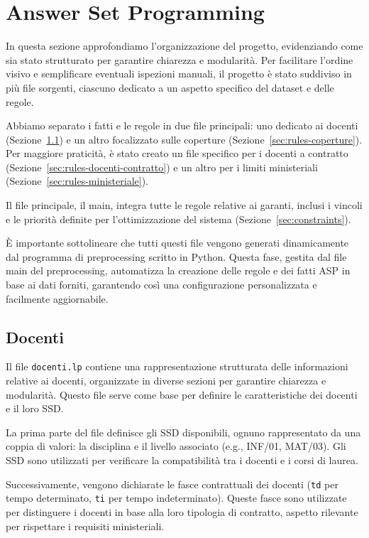 \section{Answer Set Programming}\label{sec:asp}

In questa sezione approfondiamo l'organizzazione del progetto, evidenziando 
come sia stato strutturato per garantire chiarezza e modularità. 
Per facilitare l'ordine visivo e semplificare eventuali ispezioni manuali, 
il progetto è stato suddiviso in più file sorgenti, ciascuno dedicato a un 
aspetto specifico del dataset e delle regole.

Abbiamo separato i fatti e le regole in due file principali: uno dedicato 
ai docenti (Sezione~\ref*{sec:rules-docenti}) e un altro focalizzato sulle 
coperture (Sezione~\ref*{sec:rules-coperture}). Per maggiore praticità, è 
stato creato un file specifico per i docenti a contratto 
(Sezione~\ref*{sec:rules-docenti-contratto}) e un altro per i limiti 
ministeriali (Sezione~\ref*{sec:rules-ministeriale}).

Il file principale, il main, integra tutte le regole relative ai garanti, 
inclusi i vincoli e le priorità definite per l'ottimizzazione del sistema 
(Sezione~\ref*{sec:constraints}).

È importante sottolineare che tutti questi file vengono generati dinamicamente 
dal programma di preprocessing scritto in Python. Questa fase, gestita dal 
file main del preprocessing, automatizza la creazione delle regole e dei 
fatti ASP in base ai dati forniti, garantendo così una configurazione 
personalizzata e facilmente aggiornabile. 


\subsection{Docenti}\label{sec:rules-docenti}
Il file \texttt{docenti.lp} contiene una rappresentazione strutturata delle 
informazioni relative ai docenti, organizzate in diverse sezioni per garantire 
chiarezza e modularità. Questo file serve come base per definire le caratteristiche 
dei docenti e il loro SSD.

La prima parte del file definisce gli SSD disponibili, ognuno rappresentato da una 
coppia di valori: la disciplina e il livello associato (e.g., INF/01, MAT/03). Gli SSD 
sono utilizzati per verificare la compatibilità tra i docenti e i corsi di laurea.

Successivamente, vengono dichiarate le fasce contrattuali dei docenti (\texttt{td} 
per tempo determinato, \texttt{ti} per tempo indeterminato). Queste fasce sono 
utilizzate per distinguere i docenti in base alla loro tipologia di contratto,
aspetto rilevante per rispettare i requisiti ministeriali.

